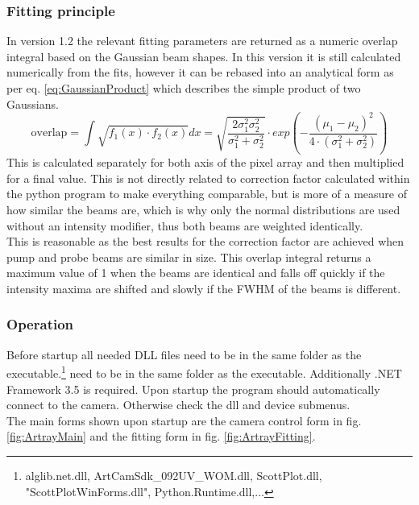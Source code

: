 \documentclass[twoside,openright]{scrreprt}
\begin{document}
\subsubsection{Fitting principle}
In version 1.2 the relevant fitting parameters are returned as a numeric overlap integral based on the Gaussian beam shapes. In this version it is still calculated numerically from the fits, however it can be rebased into an analytical form as per eq. \ref{eq:GaussianProduct} which describes the simple product of two Gaussians.
\begin{equation}
\mathrm{overlap} = \int \sqrt{f_1(x)\cdot f_2(x)}dx =  \sqrt{\frac{2 \sigma_1^2\sigma_2^2}{\sigma_1^2+\sigma_2^2}}\cdot exp\left(-\frac{\left(\mu_1-\mu_2\right)^2}{4\cdot \left(\sigma_1^2 + \sigma_2^2\right)}\right)\label{eq:GaussianProdcut}
\end{equation}
This is calculated separately for both axis of the pixel array and then multiplied for a final value. 
This is not directly related to correction factor calculated within the python program to make everything comparable, but is more of a measure of how similar the beams are, which is why only the normal distributions are used without an intensity modifier, thus both beams are weighted identically. \\
This is reasonable as the best results for the correction factor are achieved when pump and probe beams are similar in size. This overlap integral returns a maximum value of 1 when the beams are identical and falls off quickly if the intensity maxima are shifted and slowly if the FWHM of the beams is different.\\
\subsubsection{Operation}
Before startup all needed DLL files need to be in the same folder as the executable.\footnote{alglib.net.dll, ArtCamSdk\_092UV\_WOM.dll, ScottPlot.dll, "ScottPlotWinForms.dll", Python.Runtime.dll,...} need to be in the same folder as the executable. Additionally .NET Framework 3.5 is required. Upon startup the program should automatically connect to the camera. Otherwise check the dll and device submenus.\\
The main forms shown upon startup are the camera control form in fig. \ref{fig:ArtrayMain} and the fitting form in fig. \ref{fig:ArtrayFitting}.
\end{document}
